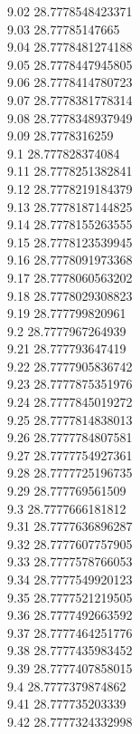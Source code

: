 {9.02	28.7778548423371\\
9.03	28.77785147665\\
9.04	28.7778481274188\\
9.05	28.7778447945805\\
9.06	28.7778414780723\\
9.07	28.7778381778314\\
9.08	28.7778348937949\\
9.09	28.7778316259\\
9.1	28.777828374084\\
9.11	28.7778251382841\\
9.12	28.7778219184379\\
9.13	28.7778187144825\\
9.14	28.7778155263555\\
9.15	28.7778123539945\\
9.16	28.7778091973368\\
9.17	28.7778060563202\\
9.18	28.7778029308823\\
9.19	28.777799820961\\
9.2	28.7777967264939\\
9.21	28.777793647419\\
9.22	28.7777905836742\\
9.23	28.7777875351976\\
9.24	28.7777845019272\\
9.25	28.7777814838013\\
9.26	28.7777784807581\\
9.27	28.7777754927361\\
9.28	28.7777725196735\\
9.29	28.777769561509\\
9.3	28.7777666181812\\
9.31	28.7777636896287\\
9.32	28.7777607757905\\
9.33	28.7777578766053\\
9.34	28.7777549920123\\
9.35	28.7777521219505\\
9.36	28.7777492663592\\
9.37	28.7777464251776\\
9.38	28.7777435983452\\
9.39	28.7777407858015\\
9.4	28.7777379874862\\
9.41	28.777735203339\\
9.42	28.7777324332998\\
}
